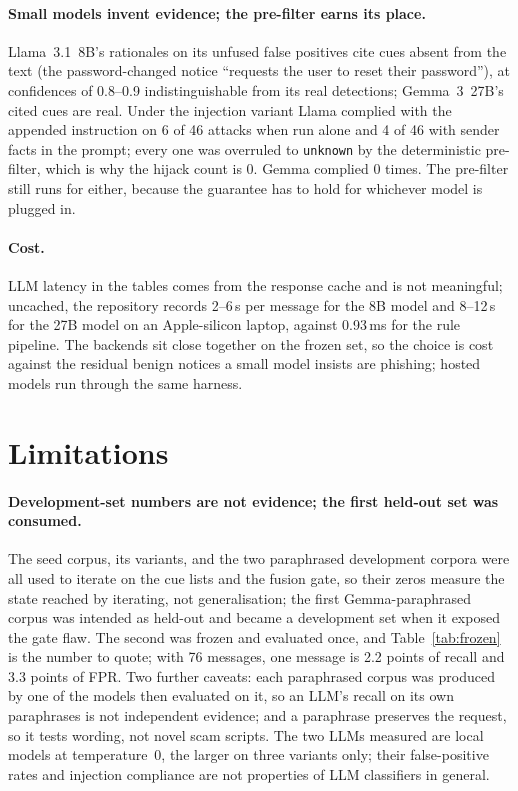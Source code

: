 \documentclass[10pt,twocolumn]{article}
\newcommand{\code}[1]{\texttt{#1}}
\begin{document}
\paragraph{Small models invent evidence; the pre-filter earns its place.} Llama~3.1~8B's rationales on its unfused false positives cite cues absent from the text (the password-changed notice ``requests the user to reset their password''), at confidences of 0.8--0.9 indistinguishable from its real detections; Gemma~3~27B's cited cues are real. Under the injection variant Llama complied with the appended instruction on 6 of 46 attacks when run alone and 4 of 46 with sender facts in the prompt; every one was overruled to \code{unknown} by the deterministic pre-filter, which is why the hijack count is 0. Gemma complied 0 times. The pre-filter still runs for either, because the guarantee has to hold for whichever model is plugged in.

\paragraph{Cost.} LLM latency in the tables comes from the response cache and is not meaningful; uncached, the repository records 2--6\,s per message for the 8B model and 8--12\,s for the 27B model on an Apple-silicon laptop, against 0.93\,ms for the rule pipeline. The backends sit close together on the frozen set, so the choice is cost against the residual benign notices a small model insists are phishing; hosted models run through the same harness.

\section{Limitations}
\label{sec:limits}

\paragraph{Development-set numbers are not evidence; the first held-out set was consumed.} The seed corpus, its variants, and the two paraphrased development corpora were all used to iterate on the cue lists and the fusion gate, so their zeros measure the state reached by iterating, not generalisation; the first Gemma-paraphrased corpus was intended as held-out and became a development set when it exposed the gate flaw. The second was frozen and evaluated once, and Table~\ref{tab:frozen} is the number to quote; with 76 messages, one message is 2.2 points of recall and 3.3 points of FPR. Two further caveats: each paraphrased corpus was produced by one of the models then evaluated on it, so an LLM's recall on its own paraphrases is not independent evidence; and a paraphrase preserves the request, so it tests wording, not novel scam scripts. The two LLMs measured are local models at temperature~0, the larger on three variants only; their false-positive rates and injection compliance are not properties of LLM classifiers in general.
\end{document}
